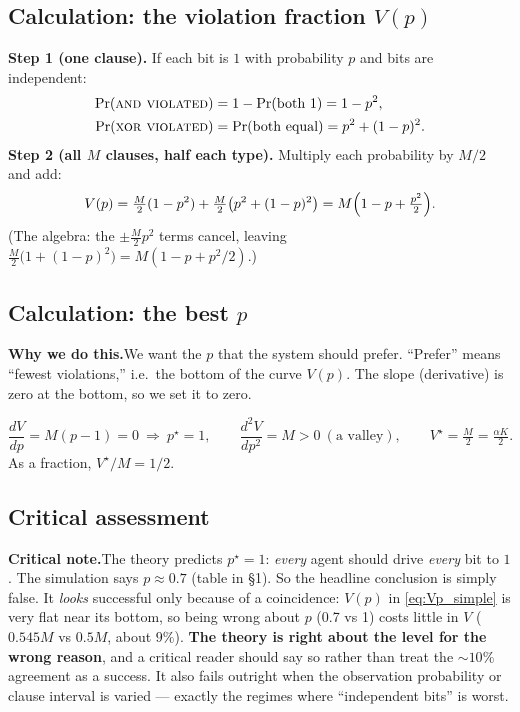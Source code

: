 \documentclass[11pt]{article}
\newcommand{\why}[1]{%
  \par\smallskip\noindent
  \colorbox{blue!8}{\parbox{\dimexpr\linewidth-2\fboxsep}{%
  \textbf{Why we do this.}\quad #1}}\par\smallskip}
\newcommand{\crit}[1]{%
  \par\smallskip\noindent
  \colorbox{red!8}{\parbox{\dimexpr\linewidth-2\fboxsep}{%
  \textbf{Critical note.}\quad #1}}\par\smallskip}
\begin{document}
\subsection{Calculation: the violation fraction $V(p)$}
\textbf{Step 1 (one clause).} If each bit is $1$ with probability $p$ and bits are independent:
\begin{align}
\Pr(\textsc{and violated}) &= 1-\Pr(\text{both }1)=1-p^2,\\
\Pr(\textsc{xor violated}) &= \Pr(\text{both equal})=p^2+(1-p)^2 .
\end{align}
\textbf{Step 2 (all $M$ clauses, half each type).} Multiply each probability by $M/2$ and add:
\begin{equation}
V(p)=\tfrac{M}{2}(1-p^2)+\tfrac{M}{2}\bigl(p^2+(1-p)^2\bigr)
   = M\Bigl(1-p+\tfrac{p^2}{2}\Bigr).
\label{eq:Vp_simple}
\end{equation}
(The algebra: the $\pm\tfrac{M}{2}p^2$ terms cancel, leaving $\tfrac{M}{2}\bigl(1+(1-p)^2\bigr)
= M(1-p+p^2/2)$.)

\subsection{Calculation: the best $p$}
\why{We want the $p$ that the system should prefer. ``Prefer'' means ``fewest violations,'' i.e.\
the bottom of the curve $V(p)$. The slope (derivative) is zero at the bottom, so we set it to zero.}
\begin{equation}
\frac{dV}{dp}=M(p-1)=0\ \Rightarrow\ p^\star=1,\qquad
\frac{d^2V}{dp^2}=M>0\ (\text{a valley}),\qquad
\boxed{V^\star=\tfrac{M}{2}=\tfrac{\alpha K}{2}}.
\end{equation}
As a fraction, $V^\star/M = 1/2$.

\subsection{Critical assessment}
\crit{The theory predicts $p^\star=1$: \emph{every} agent should drive \emph{every} bit to $1$. The
simulation says $p\approx0.7$ (table in \S1). So the headline conclusion is simply false. It
\emph{looks} successful only because of a coincidence: $V(p)$ in \eqref{eq:Vp_simple} is very flat
near its bottom, so being wrong about $p$ (0.7 vs 1) costs little in $V$ ($0.545M$ vs $0.5M$,
about $9\%$). \textbf{The theory is right about the level for the wrong reason}, and a critical
reader should say so rather than treat the $\sim\!10\%$ agreement as a success. It also fails
outright when the observation probability or clause interval is varied --- exactly the regimes
where ``independent bits'' is worst.}
\end{document}
